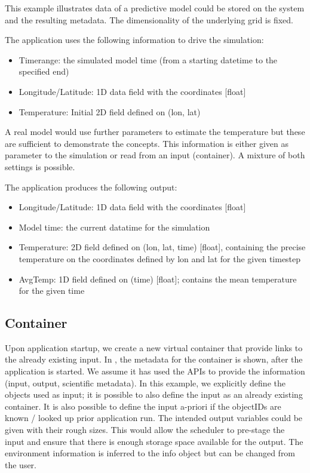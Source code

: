 This example illustrates data of a predictive model could be stored on the system and the resulting metadata.
The dimensionality of the underlying grid is fixed.

The application uses the following information to drive the simulation:
\begin{itemize}
	\item Timerange: the simulated model time (from a starting datetime to the specified end)
	\item Longitude/Latitude: 1D data field with the coordinates [float]
	\item Temperature: Initial 2D field defined on (lon, lat)
\end{itemize}
A real model would use further parameters to estimate the temperature but these are sufficient to demonstrate the concepts.
This information is either given as parameter to the simulation or read from an input (container).
A mixture of both settings is possible.


The application produces the following output:
\begin{itemize}
	\item Longitude/Latitude: 1D data field with the coordinates [float]
	\item Model time: the current datatime for the simulation
	\item Temperature: 2D field defined on (lon, lat, time) [float], containing the precise temperature on the coordinates defined by lon and lat for the given timestep
	\item AvgTemp: 1D field defined on (time) [float]; contains the mean temperature for the given time
\end{itemize}

\subsection{Container}

Upon application startup, we create a new virtual container that provide links to the already existing input.
In , the metadata for the container is shown, after the application is started.
We assume it has used the APIs to provide the information (input, output, scientific metadata).
In this example, we explicitly define the objects used as input; it is possible to also define
the input as an already existing container.
It is also possible to define the input a-priori if the objectIDs are known / looked up prior application run.
The intended output variables could be given with their rough sizes.
This would allow the scheduler to pre-stage the input and ensure that there is enough storage space available for the output.
The environment information is inferred to the info object but can be changed from the user.

